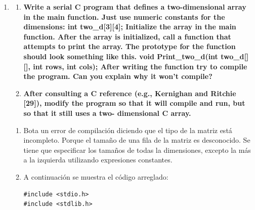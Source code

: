 \documentclass[a4paper,12pt]{article}
\begin{document}
\begin{enumerate}
\begin{lstlisting}
int main(){
	int my_rank;
	int comm_sz;
	int n = 10;
	MPI_Init(NULL,NULL);
	MPI_Comm_size(MPI_COMM_WORLD,&comm_sz);
	MPI_Comm_rank(MPI_COMM_WORLD,&my_rank);
	int * vector = getRandomVector(n);
	int * dis = (int*) malloc(sizeof(int) * comm_sz);
	int * scounts = (int*) malloc(sizeof(int) * comm_sz);
	int local_n = 0;
	int total_res;
	if(my_rank != comm_sz - 1) local_n = n / comm_sz;
	else local_n = (n / comm_sz) + (n % comm_sz);
	int * local_vector = (int *) malloc(sizeof(int) * local_n);
	for(int i = 0; i < comm_sz; i++){
		dis[i] = i * local_n;
		if(i != comm_sz - 1) scounts[i] = local_n;
		else scounts[i] = local_n + (n % comm_sz);
	}
	MPI_Scatterv(vector,scounts,dis,MPI_INT,local_vector,local_n,MPI_INT,0,MPI_COMM_WORLD);
	int res = suma(local_vector,local_n);
	MPI_Reduce(&res,&total_res,1,MPI_INT,MPI_SUM,0,MPI_COMM_WORLD);
	if(my_rank == 0) {
		printVector(vector,n);
		printf("%d\n",total_res);
	}


	MPI_Finalize();
	return 0;
}
\end{lstlisting}

\item {
  \begin{enumerate}
   \item \textbf{Write a serial C program that defines a two-dimensional array in the main function.
   Just use numeric constants for the dimensions: int two\_d[3][4]; Initialize the array in
   the main function. After the array is initialized, call a function that attempts to print the array.
   The prototype for the function should look something like this. 
   void Print\_two\_d(int two\_d[][], int rows, int cols); After writing the function try
   to compile the program. Can you explain why it won’t compile?}
   \item \textbf{After consulting a C reference (e.g., Kernighan and Ritchie [29]), modify the program
   so that it will compile and run, but so that it still uses a two- dimensional C array.}
   
  \end{enumerate}
}

\begin{enumerate}
 \item Bota un error de compilación diciendo que el tipo de la matriz está incompleto. Porque el tamaño de una fila
 de la matriz es desconocido. Se tiene que especificar los tamaños de todas la dimensiones, excepto 
 la más a la izquierda utilizando expresiones constantes.
 \item A continuación se muestra el código arreglado:
\begin{lstlisting}
#include <stdio.h>
#include <stdlib.h>


\end{lstlisting}
\end{enumerate}
\end{enumerate}
\end{document}
